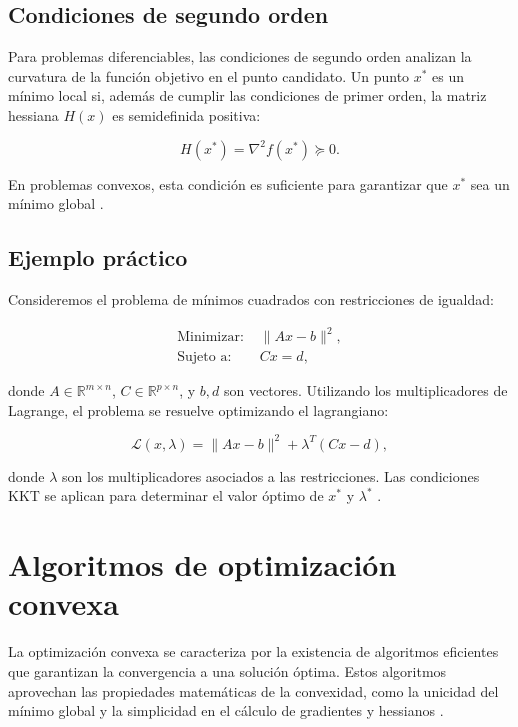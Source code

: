 \subsection{Condiciones de segundo orden}

Para problemas diferenciables, las condiciones de segundo orden analizan la curvatura de la función objetivo en el punto candidato. Un punto \(x^*\) es un mínimo local si, además de cumplir las condiciones de primer orden, la matriz hessiana \(H(x)\) es semidefinida positiva:

\begin{equation}
	H(x^*) = \nabla^2 f(x^*) \succeq 0.
\end{equation}

En problemas convexos, esta condición es suficiente para garantizar que \(x^*\) sea un mínimo global \cite{boyd2004convex}.

\subsection{Ejemplo práctico}

Consideremos el problema de mínimos cuadrados con restricciones de igualdad:

\begin{align}
	\text{Minimizar: } & \|Ax - b\|^2, \\
	\text{Sujeto a: } & Cx = d,
\end{align}

donde \(A \in \mathbb{R}^{m \times n}\), \(C \in \mathbb{R}^{p \times n}\), y \(b, d\) son vectores. Utilizando los multiplicadores de Lagrange, el problema se resuelve optimizando el lagrangiano:

\begin{equation}
	\mathcal{L}(x, \lambda) = \|Ax - b\|^2 + \lambda^T (Cx - d),
\end{equation}

donde \(\lambda\) son los multiplicadores asociados a las restricciones. Las condiciones KKT se aplican para determinar el valor óptimo de \(x^*\) y \(\lambda^*\) \cite{nocedal1999optimization}.


\section{Algoritmos de optimización convexa}

La optimización convexa se caracteriza por la existencia de algoritmos eficientes que garantizan la convergencia a una solución óptima. Estos algoritmos aprovechan las propiedades matemáticas de la convexidad, como la unicidad del mínimo global y la simplicidad en el cálculo de gradientes y hessianos \cite{boyd2004convex}.

